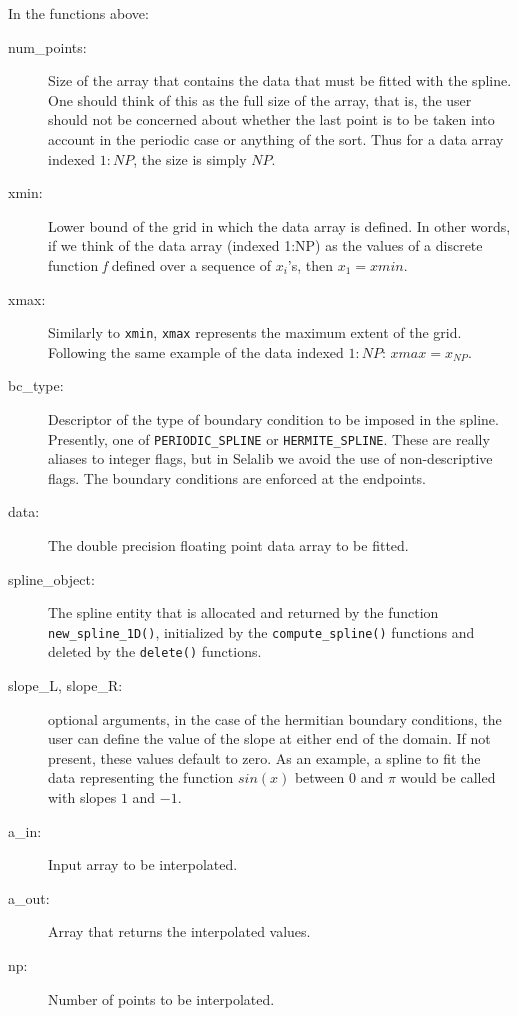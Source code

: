 \documentclass[]{report}   %
\begin{document}
In the functions above:
\begin{description}
\item[num\_points:] 
Size of the array that contains the data that must be fitted with the spline. One should think of this as the full size of the array, that is, the user should not be concerned about whether the last point is to be taken into account in the periodic case or anything of the sort. Thus for a data array indexed $1:NP$, the size is simply $NP$.
\item[xmin:]
Lower bound of the grid in which the data array is defined. In other words, if we think of the data array (indexed 1:NP) as the values of a discrete function \emph{f} defined over a sequence of $x_i$'s, then $x_1 = xmin$.
\item[xmax:]
Similarly to \verb+xmin+, \verb+xmax+ represents the maximum extent of the grid. Following the same example of the data indexed $1:NP$: $xmax = x_{NP}$. 
\item[bc\_type:]
Descriptor of the type of boundary condition to be imposed in the spline. Presently, one of \verb+PERIODIC_SPLINE+ or \verb+HERMITE_SPLINE+. These are really aliases to integer flags, but in Selalib we avoid the use of non-descriptive flags. The boundary conditions are enforced at the endpoints.
\item[data:] 
The double precision floating point data array to be fitted.
\item[spline\_object:]
The spline entity that is allocated and returned by the function \verb+new_spline_1D()+, initialized by the \verb+compute_spline()+ functions and deleted by the \verb+delete()+ functions.
\item[slope\_L, slope\_R:] optional arguments, in the case of the hermitian boundary conditions, the user can define the value of the slope at either end of the domain. If not present, these values default to zero. As an example, a spline to fit the data representing the function $sin(x)$ between $0$ and $\pi$ would be called with slopes $1$ and $-1$.
\item[a\_in:]
Input array to be interpolated.
\item[a\_out:]
Array that returns the interpolated values.
\item[np:] 
Number of points to be interpolated.
\end{description}
   
\end{document}
